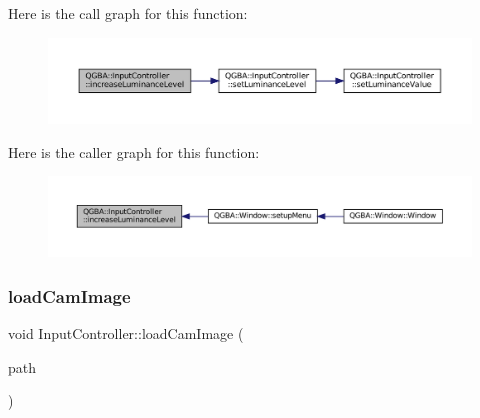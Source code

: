 Here is the call graph for this function\+:
\nopagebreak
\begin{figure}[H]
\begin{center}
\leavevmode
\includegraphics[width=350pt]{class_q_g_b_a_1_1_input_controller_a0d9d6daa47b8b5d18f22d250d253e228_cgraph}
\end{center}
\end{figure}
Here is the caller graph for this function\+:
\nopagebreak
\begin{figure}[H]
\begin{center}
\leavevmode
\includegraphics[width=350pt]{class_q_g_b_a_1_1_input_controller_a0d9d6daa47b8b5d18f22d250d253e228_icgraph}
\end{center}
\end{figure}
\mbox{\label{class_q_g_b_a_1_1_input_controller_aee5be199d0effc2fd468611bdc9a9ef5}} 
\subsubsection{\texorpdfstring{load\+Cam\+Image}{loadCamImage}}
{\footnotesize\ttfamily void Input\+Controller\+::load\+Cam\+Image (\begin{DoxyParamCaption}\item[{const Q\+String \&}]{path }\end{DoxyParamCaption})\hspace{0.3cm}{\ttfamily [slot]}}

